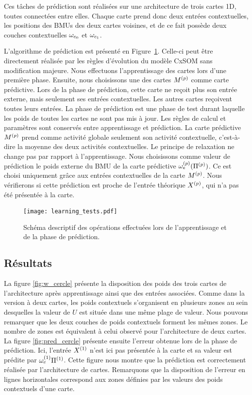 \documentclass[../main]{subfiles}
\begin{document}
Ces tâches de prédiction sont réalisées sur une architecture de trois cartes 1D, toutes connectées entre elles. 
Chaque carte prend donc deux entrées contextuelles, les positions des BMUs des deux cartes voisines, et de ce fait possède deux couches contextuelles $\omega_{c_0}$ et $\omega_{c_1}$.

L'algorithme de prédiction est présenté en Figure~\ref{fig:schema_pred}. Celle-ci peut être directement réalisée par les règles d'évolution du modèle CxSOM sans modification majeure.
Nous effectuons l'apprentissage des cartes lors d'une première phase.
Ensuite, nous choisissons une des cartes $M^{({p})}$ comme carte prédictive. Lors de la phase de prédiction, cette carte ne reçoit plus son entrée externe, mais seulement ses entrées contextuelles. 
Les autres cartes reçoivent toutes leurs entrées.
La phase de prédiction est une phase de test durant laquelle les poids de toutes les cartes ne sont pas mis à jour. Les règles de calcul et paramètres sont conservés entre apprentissage et prédiction.
La carte prédictive $M^{({p})}$ prend comme activité globale seulement son activité contextuelle, c'est-à-dire la moyenne des deux activités contextuelles. Le principe de relaxation ne change pas par rapport à l'apprentissage.
Nous choisissons comme valeur de prédiction le poids externe du BMU de la carte prédictive $\omega_{e}^{({p})}(\Pi^{({p})})$. 
Ce est choisi uniquement grâce aux entrées contextuelles de la carte $M^{({p})}$. 
Nous vérifierons si cette prédiction est proche de l'entrée théorique $X^{({p})}$, qui n'a pas été présentée à la carte.

\begin{figure}
	\texttt{[image: learning\_tests.pdf]}
	\caption{Schéma descriptif des opérations effectuées lors de l'apprentissage et de la phase de prédiction.\label{fig:schema_pred}}
\end{figure}

\subsection{Résultats}

La figure \ref{fig:w_cercle} présente la disposition des poids des trois cartes de l'architecture après apprentissage ainsi que des entrées associées. Comme dans la version à deux cartes, les poids contextuels s'organisent en plusieurs zones au sein desquelles la valeur de $U$ est située dans une même plage de valeur.
Nous pouvons remarquer que les deux couches de poids contextuels forment les mêmes zones. Le nombre de zones est équivalent à celui observé pour l'architecture de deux cartes.
La figure \ref{fig:pred_cercle} présente ensuite l'erreur obtenue lors de la phase de prédiction. 
Ici, l'entrée $X^{({1})}$ n'est ici pas présentée à la carte et sa valeur est prédite par $\omega_{e}^{({1})}{\Pi^{({1})}}$. 
Cette figure nous montre que la prédiction est correctement réalisée par l'architecture de cartes. Remarquons que la disposition de l'erreur en lignes horizontales correspond aux zones définies par les valeurs des poids contextuels d'une carte.
\end{document}
